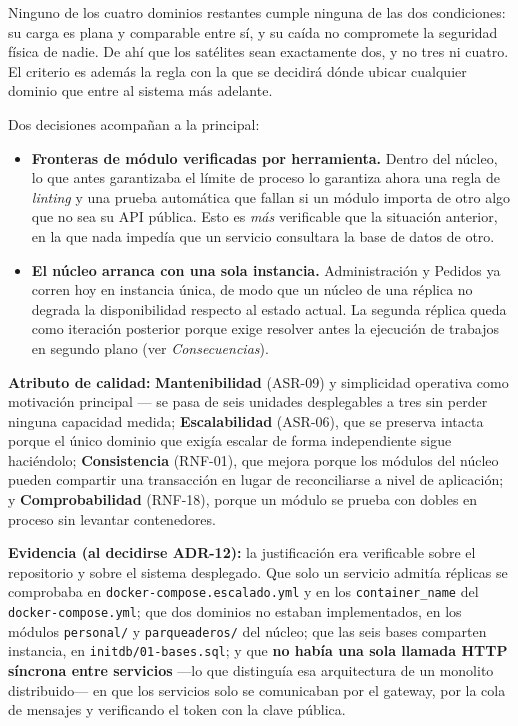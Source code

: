 \documentclass[11pt,a4paper]{article}
\begin{document}
Ninguno de los cuatro dominios restantes cumple ninguna de las dos condiciones: su carga es plana y
comparable entre sí, y su caída no compromete la seguridad física de nadie. De ahí que los satélites
sean exactamente dos, y no tres ni cuatro. El criterio es además la regla con la que se decidirá
dónde ubicar cualquier dominio que entre al sistema más adelante.

\medskip
Dos decisiones acompañan a la principal:

\begin{itemize}
  \item \textbf{Fronteras de módulo verificadas por herramienta.} Dentro del núcleo, lo que antes
        garantizaba el límite de proceso lo garantiza ahora una regla de \textit{linting} y una
        prueba automática que fallan si un módulo importa de otro algo que no sea su API pública.
        Esto es \textit{más} verificable que la situación anterior, en la que nada impedía que un
        servicio consultara la base de datos de otro.
  \item \textbf{El núcleo arranca con una sola instancia.} Administración y Pedidos ya corren hoy en
        instancia única, de modo que un núcleo de una réplica no degrada la disponibilidad respecto
        al estado actual. La segunda réplica queda como iteración posterior porque exige resolver
        antes la ejecución de trabajos en segundo plano (ver \textit{Consecuencias}).
\end{itemize}

\textbf{Atributo de calidad:} \textbf{Mantenibilidad} (ASR-09) y simplicidad operativa como
motivación principal --- se pasa de seis unidades desplegables a tres sin perder ninguna capacidad
medida; \textbf{Escalabilidad} (ASR-06), que se preserva intacta porque el único dominio que exigía
escalar de forma independiente sigue haciéndolo; \textbf{Consistencia} (RNF-01), que mejora porque
los módulos del núcleo pueden compartir una transacción en lugar de reconciliarse a nivel de
aplicación; y \textbf{Comprobabilidad} (RNF-18), porque un módulo se prueba con dobles en proceso
sin levantar contenedores.

\textbf{Evidencia (al decidirse ADR-12):} la justificación era verificable sobre el repositorio y
sobre el sistema desplegado. Que solo un servicio admitía réplicas se comprobaba en
\texttt{docker-compose.escalado.yml} y en los \texttt{container\_name} del \texttt{docker-compose.yml};
que dos dominios no estaban implementados, en los módulos \texttt{personal/} y
\texttt{parqueaderos/} del núcleo; que las seis bases comparten instancia, en
\texttt{initdb/01-bases.sql}; y que \textbf{no había una sola llamada HTTP síncrona entre servicios}
---lo que distinguía esa arquitectura de un monolito distribuido--- en que los servicios solo se
comunicaban por el gateway, por la cola de mensajes y verificando el token con la clave pública.
\end{document}
